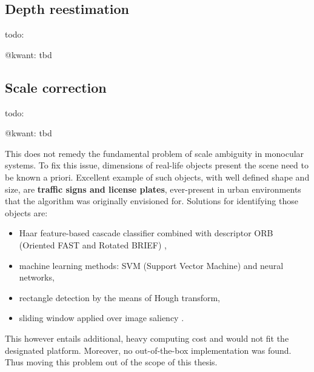 \subsection{Depth reestimation}

 todo:
 
 @kwant: tbd


\subsection{Scale correction}

 
 todo:
 
 @kwant: tbd



This does not remedy the fundamental problem of scale ambiguity in monocular systems. To fix this issue, dimensions of real-life objects present the scene need to be known a priori. Excellent example of such objects, with well defined shape and size, are \textbf{traffic signs and license plates}, ever-present in urban environments that the algorithm was originally envisioned for. Solutions for identifying those objects are:
\begin{itemize}
	\item Haar feature-based cascade classifier combined with descriptor ORB (Oriented FAST and Rotated BRIEF) \cite{opencv},
	\item machine learning methods: SVM (Support Vector Machine) and neural networks,
	\item rectangle detection by the means of Hough transform,
	\item sliding window applied over image saliency \cite{lin2010robust}.
\end{itemize}

This however entails additional, heavy computing cost and would not fit the designated platform. Moreover, no out-of-the-box implementation was found. Thus moving this problem out of the scope of this thesis.

